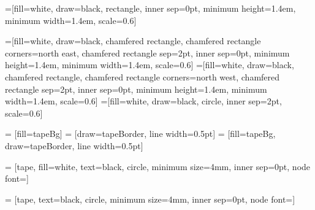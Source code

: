 =[fill=white, draw=black, rectangle, inner sep=0pt, minimum height=1.4em, minimum width=1.4em, scale=0.6]

=[fill=white, draw=black, chamfered rectangle, chamfered rectangle corners={north east}, chamfered rectangle sep=2pt, inner sep=0pt, minimum height=1.4em, minimum width=1.4em, scale=0.6]
=[fill=white, draw=black, chamfered rectangle, chamfered rectangle corners={north west}, chamfered rectangle sep=2pt, inner sep=0pt, minimum height=1.4em, minimum width=1.4em, scale=0.6]
=[fill=white, draw=black, circle, inner sep=2pt, scale=0.6]


 = [fill=tapeBg]
 = [draw=tapeBorder, line width=0.5pt]
 = [fill=tapeBg, draw=tapeBorder, line width=0.5pt]

 = [tape, fill=white, text=black, circle, minimum size=4mm, inner sep=0pt, node font={\tiny}]

 = [tape, text=black, circle, minimum size=4mm, inner sep=0pt, node font={\small}]


\newcommand{\tikzfig}[1]{
    \InputIfFileExists{#1.tikz}{}{}
}

\def\drawfill#1#2#3{{\def\skip{--}\fill[#1]#3;}{\def\skip{}\draw[#2]#3;}}

\newcommand{\sr}{\rule[-0.45cm]{0pt}{0.9cm}}

\newcommand{\comonoid}[1]{
    \begin{tikzpicture}
        \begin{pgfonlayer}{nodelayer}
            \node [style=none] (81) at (-0.75, 0) {};
            \node [style=black] (107) at (0, 0) {};
            \node [style=none] (108) at (0.5, -0.375) {};
            \node [style=none] (109) at (0.5, 0.375) {};
            \node [style=none] (110) at (0.75, -0.375) {};
            \node [style=none] (111) at (0.75, 0.375) {};
            \ifthenelse{\isempty{#1}}{}{
            \node [style=label] (112) at (1.075, -0.375) {$#1$};
            \node [style=label] (113) at (1.075, 0.375) {$#1$};
            \node [style=label] (114) at (-1.075, 0) {$#1$};
            }
        \end{pgfonlayer}
        \begin{pgfonlayer}{edgelayer}
            \draw [bend right] (109.center) to (107);
            \draw [bend right] (107) to (108.center);
            \draw (81.center) to (107);
            \draw (111.center) to (109.center);
            \draw (108.center) to (110.center);
        \end{pgfonlayer}
    \end{tikzpicture}           
 }


